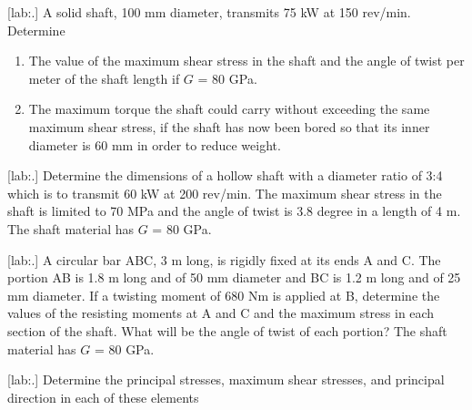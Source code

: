 \documentclass[a4paper,openany,nobib]{tufte-book}
\begin{document}
[lab:.] A solid shaft, 100 mm
diameter, transmits 75 kW at 150 rev/min. Determine



\begin{enumerate}
\item The value of the maximum shear stress in the shaft and the angle of
twist per meter of the shaft length if \(G\) = 80 GPa.

\item The maximum torque the shaft could carry without exceeding the same
maximum shear stress, if the shaft has now been bored so that its
inner diameter is 60 mm in order to reduce weight.
\end{enumerate}

[lab:.] Determine the dimensions of a
hollow shaft with a diameter ratio of 3:4 which is to transmit 60 kW at
200 rev/min. The maximum shear stress in the shaft is limited to 70 MPa
and the angle of twist is 3.8 degree in a length of 4 m. The shaft
material has \(G\) = 80 GPa.

[lab:.] A circular bar ABC, 3 m long,
is rigidly fixed at its ends A and C. The portion AB is 1.8 m long and
of 50 mm diameter and BC is 1.2 m long and of 25 mm diameter. If a
twisting moment of 680 Nm is applied at B, determine the values of the
resisting moments at A and C and the maximum stress in each section of
the shaft. What will be the angle of twist of each portion? The shaft
material has \(G\) = 80 GPa.

[lab:.] Determine the principal
stresses, maximum shear stresses, and principal direction in each of
these elements
\end{document}
